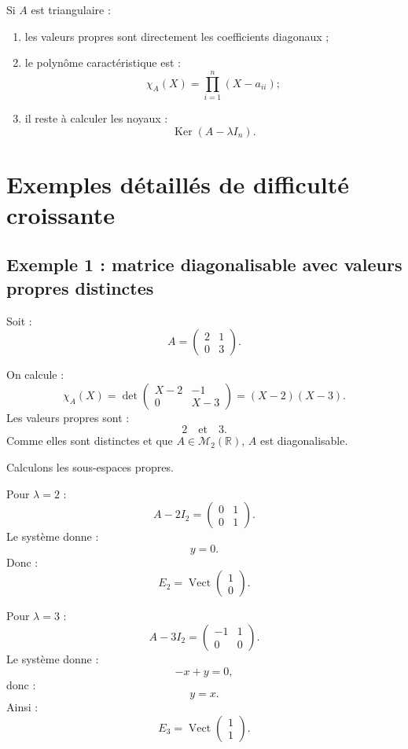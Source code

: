 \documentclass[11pt,a4paper]{article}
\newcommand{\R}{\mathbb R}
\newcommand{\M}{\mathcal M}
\newcommand{\Vect}{\operatorname{Vect}}
\newcommand{\Ker}{\operatorname{Ker}}
\begin{document}
\begin{methodbox}
Si \(A\) est triangulaire :
\begin{enumerate}
    \item les valeurs propres sont directement les coefficients diagonaux ;
    \item le polynôme caractéristique est :
    \[
    \chi_A(X)=\prod_{i=1}^n(X-a_{ii});
    \]
    \item il reste à calculer les noyaux :
    \[
    \Ker(A-\lambda I_n).
    \]
\end{enumerate}
\end{methodbox}

\section{Exemples détaillés de difficulté croissante}

\subsection{Exemple 1 : matrice diagonalisable avec valeurs propres distinctes}

Soit :
\[
A=
\begin{pmatrix}
2&1\\
0&3
\end{pmatrix}.
\]

On calcule :
\[
\chi_A(X)=
\det
\begin{pmatrix}
X-2&-1\\
0&X-3
\end{pmatrix}
=
(X-2)(X-3).
\]
Les valeurs propres sont :
\[
2
\quad\text{et}\quad
3.
\]
Comme elles sont distinctes et que \(A\in\M_2(\R)\), \(A\) est diagonalisable.

Calculons les sous-espaces propres.

Pour \(\lambda=2\) :
\[
A-2I_2=
\begin{pmatrix}
0&1\\
0&1
\end{pmatrix}.
\]
Le système donne :
\[
y=0.
\]
Donc :
\[
E_2=\Vect
\begin{pmatrix}
1\\0
\end{pmatrix}.
\]

Pour \(\lambda=3\) :
\[
A-3I_2=
\begin{pmatrix}
-1&1\\
0&0
\end{pmatrix}.
\]
Le système donne :
\[
-x+y=0,
\]
donc :
\[
y=x.
\]
Ainsi :
\[
E_3=\Vect
\begin{pmatrix}
1\\1
\end{pmatrix}.
\]
\end{document}
